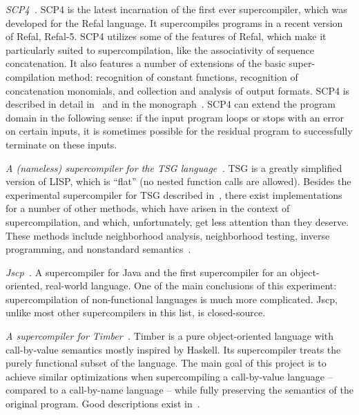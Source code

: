 \begin{longitem}

\item \emph{SCP4~\cite{Scp4Url}.} SCP4 
is the latest incarnation of the first ever supercompiler, which was
developed for the Refal language. 
It supercompiles programs in a recent version of Refal, Refal-5.
SCP4 utilizes some of the features of Refal, which make it particularly
suited to supercompilation, like the associativity of sequence concatenation.
It also features a number of extensions of the basic super-compilation method:
recognition of constant functions,
recognition of concatenation monomials, and
collection and analysis of output formats.
SCP4 is described in detail in~\cite{Nemytykh2008PhD} and in the monograph~\cite{Nemytykh2007SCP4}.
SCP4 can extend the program domain in the following sense:
if the input program loops or stops with an error on certain inputs,
it is sometimes possible for the residual program to successfully terminate on these inputs.

\item \emph{A (nameless) supercompiler for the  TSG language~\cite{TsgUrl}.} TSG 
    is a greatly simplified version of LISP, which is ``flat'' (no nested function calls are allowed).
Besides the experimental supercompiler for TSG described in~\cite{Abramov2006meta2},
there exist implementations for a number of other methods, which have arisen 
in the context of supercompilation, and which, unfortunately, get less attention
than they deserve.
These methods include neighborhood analysis, neighborhood testing, inverse programming, and
nonstandard semantics~\cite{Abramov1995meta}.

\item \emph{Jscp\cite{Klimov2008Jscp}~\cite{JscpUrl}.} A supercompiler for Java and
the first supercompiler for an object-oriented, real-world language.
One of the main conclusions of this experiment: supercompilation of
non-functional languages is much more complicated.
Jscp, unlike most other supercompilers in this list, is closed-source.

\item \emph{A supercompiler for Timber~\cite{TimberUrl}.} Timber 
is a pure object-oriented language with call-by-value semantics mostly inspired by Haskell.
Its supercompiler treats the purely functional subset of the language.
The main goal of this project is to achieve similar optimizations 
when supercompiling a call-by-value language -- compared to a call-by-name language --
while fully preserving the semantics of the original program.
Good descriptions exist in~\cite{Jonsson2008Supercompilation,Jonsson2011Phd}.


\end{longitem}
